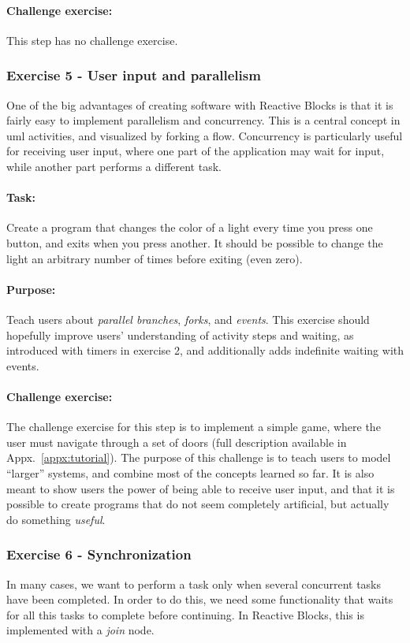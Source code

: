 \paragraph{Challenge exercise:} This step has no challenge exercise.

\subsubsection{Exercise 5 - User input and parallelism}
One of the big advantages of creating software with Reactive Blocks is that it is fairly easy to implement parallelism and concurrency. This is a central concept in \gls{uml} activities, and visualized by forking a flow. Concurrency is particularly useful for receiving user input, where one part of the application may wait for input, while another part performs a different task.

\paragraph{Task:} Create a program that changes the color of a light every time you press one button, and exits when you press another. It should be possible to change the light an arbitrary number of times before exiting (even zero).

\paragraph{Purpose:} Teach users about \emph{parallel branches}, \emph{forks}, and \emph{events}. This exercise should hopefully improve users' understanding of activity steps and waiting, as introduced with timers in exercise 2, and additionally adds indefinite waiting with events.

\paragraph{Challenge exercise:} The challenge exercise for this step is to implement a simple game, where the user must navigate through a set of doors (full description available in Appx.~\ref{appx:tutorial}). The purpose of this challenge is to teach users to model ``larger'' systems, and combine most of the concepts learned so far. It is also meant to show users the power of being able to receive user input, and that it is possible to create programs that do not seem completely artificial, but actually do something \emph{useful}.

\subsubsection{Exercise 6 - Synchronization}
In many cases, we want to perform a task only when several concurrent tasks have been completed. In order to do this, we need some functionality that waits for all this tasks to complete before continuing. In Reactive Blocks, this is implemented with a \emph{join} node.

